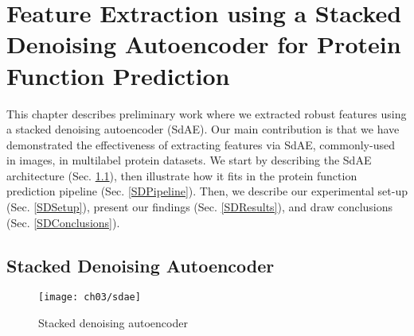 %
%
%
%
%

\chapter[Stacked Denoising Autoencoder for Protein Function Prediction]{
    \huge
    Feature Extraction using a Stacked Denoising Autoencoder for Protein
    Function Prediction
}
\label{SDAEChapter}

\par This chapter describes preliminary work where we extracted robust
features using a stacked denoising autoencoder (SdAE). Our main contribution
is that we have demonstrated the effectiveness of extracting features via
SdAE, commonly-used in images, in multilabel protein datasets. We start by
describing the SdAE architecture (Sec. \ref{SDArchitecture}), then illustrate
how it fits in the protein function prediction pipeline (Sec.
\ref{SDPipeline}). Then, we describe our experimental set-up (Sec.
\ref{SDSetup}), present our findings (Sec. \ref{SDResults}), and draw conclusions
(Sec. \ref{SDConclusions}).

\section{Stacked Denoising Autoencoder}
\label{SDArchitecture}

\begin{wrapfigure}{r}{0.53\textwidth}
  \centering
  \texttt{[image: ch03/sdae]}
  \caption{Stacked denoising autoencoder}
  \label{schema:sdae}
\end{wrapfigure}


